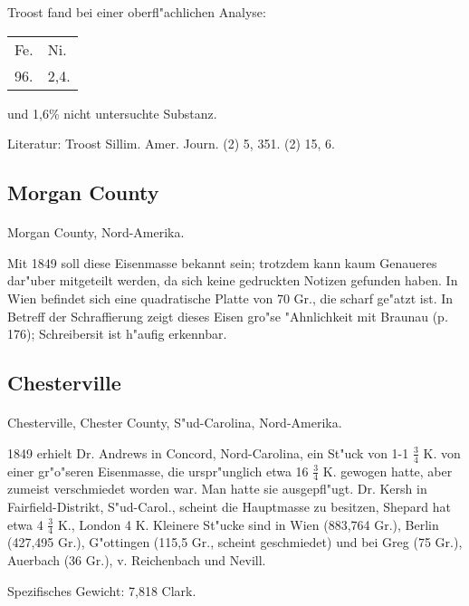 \documentclass[a4paper, 11pt, oneside]{article}
\begin{document}
Troost fand bei einer oberfl"achlichen Analyse:
\begin{table}[H]
    \centering
    \begin{tabular}{l l}
        Fe. & Ni. \\
        96. & 2,4. \\
    \end{tabular}
\end{table}

und 1,6\% nicht untersuchte Substanz.

\footnotesize
Literatur: Troost Sillim. Amer. Journ. (2) 5, 351. (2) 15, 6.

\subsection{Morgan County}
\normalsize
\paragraph{}
Morgan County, Nord-Amerika.

Mit 1849 soll diese Eisenmasse bekannt sein; trotzdem kann kaum Genaueres dar"uber mitgeteilt werden, da sich keine gedruckten Notizen gefunden haben. In Wien befindet sich eine quadratische Platte von 70 Gr., die scharf ge"atzt ist. In Betreff der Schraffierung zeigt dieses Eisen gro"se "Ahnlichkeit mit Braunau (p. 176); Schreibersit ist h"aufig erkennbar.

\subsection{Chesterville}
\paragraph{}
Chesterville, Chester County, S"ud-Carolina, Nord-Amerika.

1849 erhielt Dr. Andrews in Concord, Nord-Carolina, ein St"uck von 1-1 $\frac{3}{4}$ K. von einer gr"o"seren Eisenmasse, die urspr"unglich etwa 16 $\frac{3}{4}$ K. gewogen hatte, aber zumeist verschmiedet worden war. Man hatte sie ausgepfl"ugt. Dr. Kersh in Fairfield-Distrikt, S"ud-Carol., scheint die Hauptmasse zu besitzen, Shepard hat etwa 4 $\frac{3}{4}$ K., London 4 K. Kleinere St"ucke sind in Wien (883,764 Gr.), Berlin (427,495 Gr.), G"ottingen (115,5 Gr., scheint geschmiedet) und bei Greg (75 Gr.), Auerbach (36 Gr.), v. Reichenbach und Nevill.

Spezifisches Gewicht: 7,818 Clark.
\end{document}
